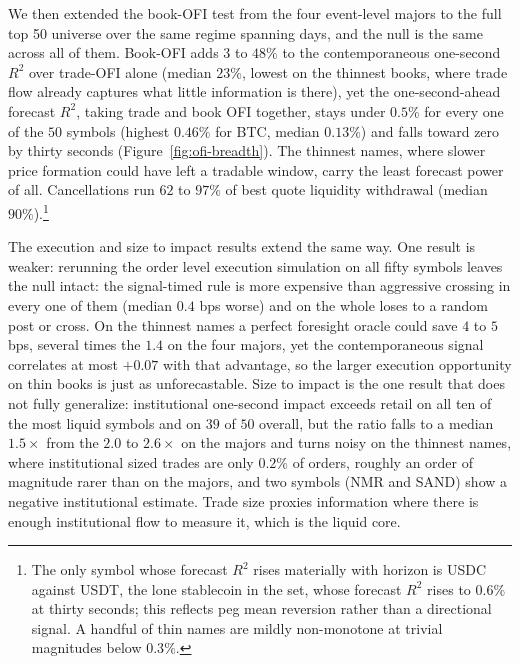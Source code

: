 \documentclass[11pt]{article}
\begin{document}
We then extended the book-OFI test from the four event-level majors to the full top 50
universe over the same regime spanning days, and the null is the same across all of them. Book-OFI
adds $3$ to $48\%$ to the contemporaneous one-second $R^2$ over trade-OFI alone (median $23\%$,
lowest on the thinnest books, where trade flow already captures what little information is there),
yet the one-second-ahead forecast $R^2$, taking trade and book OFI together, stays under $0.5\%$ for every one of the $50$ symbols
(highest $0.46\%$ for BTC, median $0.13\%$) and falls toward zero by thirty seconds
(Figure~\ref{fig:ofi-breadth}). The thinnest names, where slower price formation could have left a
tradable window, carry the least forecast power of all. Cancellations run $62$ to $97\%$ of best
quote liquidity withdrawal (median $90\%$).\footnote{The only symbol whose forecast $R^2$ rises materially with horizon is USDC
against USDT, the lone stablecoin in the set, whose forecast $R^2$ rises to $0.6\%$ at thirty
seconds; this reflects peg mean reversion rather than a directional signal. A handful of thin names
are mildly non-monotone at trivial magnitudes below $0.3\%$.}

The execution and size to impact results extend the same way. One result is weaker: rerunning the order
level execution simulation on all fifty symbols leaves the null intact: the signal-timed rule is
more expensive than aggressive crossing in every one of them (median $0.4$ bps worse) and on the whole loses to a
random post or cross. On the thinnest names a perfect foresight oracle could save $4$ to $5$ bps,
several times the $1.4$ on the four majors, yet the contemporaneous signal correlates at most $+0.07$ with
that advantage, so the larger execution opportunity on thin books is just as unforecastable. Size to
impact is the one result that does not fully generalize: institutional one-second impact exceeds
retail on all ten of the most liquid symbols and on $39$ of $50$ overall, but the ratio falls to a
median $1.5\times$ from the $2.0$ to $2.6\times$ on the majors and turns noisy on the thinnest names,
where institutional sized trades are only $0.2\%$ of orders, roughly an order of magnitude rarer than on the majors, and two
symbols (NMR and SAND) show a negative institutional estimate. Trade size proxies information where there is enough institutional
flow to measure it, which is the liquid core.
\end{document}
